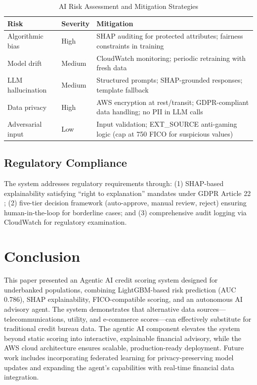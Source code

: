 \documentclass[12pt,a4paper]{article}
\begin{document}
\begin{table}[htbp]
\caption{AI Risk Assessment and Mitigation Strategies}
\label{tab:risks}
\centering
\small
\begin{tabular}{p{1.4cm}p{1.2cm}p{4.5cm}}
\toprule
\textbf{Risk} & \textbf{Severity} & \textbf{Mitigation} \\
\midrule
Algorithmic bias & High & SHAP auditing for protected attributes; fairness constraints in training \\
\addlinespace
Model drift & Medium & CloudWatch monitoring; periodic retraining with fresh data \\
\addlinespace
LLM hallucination & Medium & Structured prompts; SHAP-grounded responses; template fallback \\
\addlinespace
Data privacy & High & AWS encryption at rest/transit; GDPR-compliant data handling; no PII in LLM calls \\
\addlinespace
Adversarial input & Low & Input validation; EXT\_SOURCE anti-gaming logic (cap at 750 FICO for suspicious values) \\
\bottomrule
\end{tabular}
\end{table}

\subsection{Regulatory Compliance}
The system addresses regulatory requirements through: (1) SHAP-based explainability satisfying ``right to explanation'' mandates under GDPR Article 22 \cite{gdpr2016}; (2) five-tier decision framework (auto-approve, manual review, reject) ensuring human-in-the-loop for borderline cases; and (3) comprehensive audit logging via CloudWatch for regulatory examination.

\section{Conclusion}

This paper presented an Agentic AI credit scoring system designed for underbanked populations, combining LightGBM-based risk prediction (AUC 0.786), SHAP explainability, FICO-compatible scoring, and an autonomous AI advisory agent. The system demonstrates that alternative data sources---telecommunications, utility, and e-commerce scores---can effectively substitute for traditional credit bureau data. The agentic AI component elevates the system beyond static scoring into interactive, explainable financial advisory, while the AWS cloud architecture ensures scalable, production-ready deployment. Future work includes incorporating federated learning for privacy-preserving model updates and expanding the agent's capabilities with real-time financial data integration.
\end{document}
